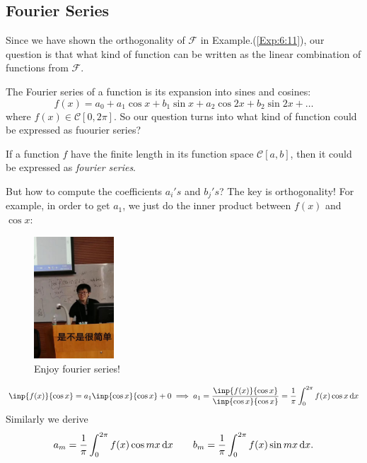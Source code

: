 \subsection{Fourier Series}
Since we have shown the orthogonality of $\mathcal{F}$ in Example.(\ref{Exp:6:11}), our question is that what kind of function can be written as the linear combination of functions from $\mathcal{F}$.

The Fourier series of a function is its expansion into sines and cosines:
\[
f(x)=a_0+a_1\cos x+b_1\sin x+a_2\cos 2x+b_2\sin 2x+\dots
\]
where $f(x)\in \mathcal{C}[0,2\pi]$. So our question turns into what kind of function could be expressed as fuourier series?
\begin{theorem}
If a function $f$ have the finite length in its function space $\mathcal{C}[a,b]$, then it could be expressed as \textit{fourier series}.
\end{theorem}
But how to compute the coefficients $a_i's$ and $b_j's$? The key is orthogonality! For example, in order to get $a_1$, we just do the inner product between $f(x)$ and $\cos x$:
\begin{figure}[H]\centering
\includegraphics[width=3cm]{week5/1810645243}
\caption{Enjoy fourier series!}
\end{figure}
\[
\inp{f(x)}{\cos x}=a_1\inp{\cos x}{\cos x}+0
\implies
a_1=\frac{\inp{f(x)}{\cos x}}{\inp{\cos x}{\cos x}}=\frac{1}{\pi}\int_{0}^{2\pi}f(x)\cos x\diff x
\]
Similarly we derive 
\[
a_m=\frac{1}{\pi}\int_{0}^{2\pi}f(x)\cos mx\,\mathrm{d} x
\qquad
b_m=\frac{1}{\pi}\int_{0}^{2\pi}f(x)\sin mx\,\mathrm{d} x.
\]